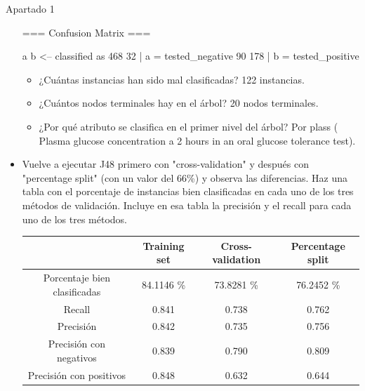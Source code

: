 \documentclass[11pt, a4paper, spanish, openright, twoside]{book}
\begin{document}
\begin{section}{Apartado 1}
\begin{itemize}
=== Confusion Matrix ===

   a   b   <-- classified as
 468  32 |   a = tested_negative
  90 178 |   b = tested_positive

		\begin{itemize}
			 \item ¿Cuántas instancias han sido mal clasificadas? 122 instancias.
			\item ¿Cuántos nodos terminales hay en el árbol? 20 nodos terminales.
			\item ¿Por qué atributo se clasifica en el primer nivel del árbol? Por plass ( Plasma glucose concentration a 2 hours in an oral glucose tolerance test).
		\end{itemize}

	\item  Vuelve a ejecutar J48 primero con "cross-validation" y después con "percentage split" (con un valor 
	del 66\%) y observa las diferencias. Haz una tabla con el porcentaje de instancias bien clasificadas en 
	cada uno de los tres métodos de validación. Incluye en esa tabla la precisión y el recall para cada 
	uno de los tres métodos.

		\begin{center}
 			 \begin{tabular}{| c | c | c | c |}
 			   \hline
			     				       	  & Training set 	& Cross-validation 		& Percentage split  \\ \hline
			    Porcentaje bien clasificadas  	  & 84.1146 \% 	& 73.8281 \%		& 76.2452 \% \\ \hline			 
			    Recall 			     	  & 0.841  		& 0.738 			& 0.762 \\ \hline 
			    Precisión			      	  & 0.842  		& 0.735 			& 0.756  \\ \hline \hline
			    Precisión con negativos		  & 0.839		& 0.790			& 0.809 \\ \hline
			    Precisión con positivos 		  & 0.848 		& 0.632			& 0.644 \\ 
			    \hline
			  \end{tabular}
		\end{center}


\end{itemize}
\end{section}
\end{document}

